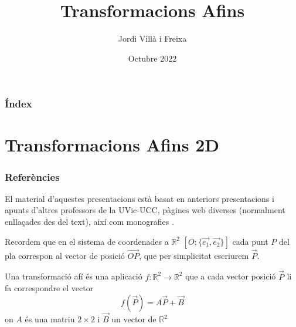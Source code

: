 \documentclass{beamer}
\title[Àlgebra Lineal]{Transformacions Afins} %
\author{Jordi Villà i Freixa} %
\institute[FCTE] %
{
Universitat de Vic - Universitat Central de Catalunya \\
Grau en Multimèdia. Aplicacions i Videojocs\\ %
\medskip
\textit{jordi.villa@uvic.cat} %
}
\date{Octubre 2022}
\begin{document}
\begin{frame}
\titlepage %
\end{frame}

\begin{frame}
\frametitle{Índex} %
\tableofcontents %
\end{frame}


\section{Transformacions Afins 2D} %

\begin{frame}
\frametitle{Referències}
El material d'aquestes presentacions està basat en anteriors presentacions i apunts d'altres professors \cite{jlgarcia,mcorbera,mcalle} de la UVic-UCC, pàgines web diverses (normalment enllaçades des del text), així com monografies \cite{vanverth,schaum,riley}.
\end{frame}

\begin{frame}
Recordem que en el sistema de coordenades a $\mathbb{R}^2$ $[O;\{\overrightarrow{e_1},\overrightarrow{e_2}\}]$ cada punt $P$ del pla correspon al vector de posició $\overrightarrow{OP}$, que per simplicitat escriurem $\overrightarrow{P}$.

\begin{definicio}
  Una transformació afí és una aplicació $f:\mathbb{R}^2 \rightarrow \mathbb{R}^2$ que a cada vector posició $\overrightarrow{P}$ li fa correspondre el vector
  $$
    f(\overrightarrow{P})= A\overrightarrow{P}+\overrightarrow{B}
  $$
  on $A$ és una matriu $2\times 2$ i $\overrightarrow{B}$ un vector de $\mathbb{R}^2$
\end{definicio}
\end{frame}
\end{document}
